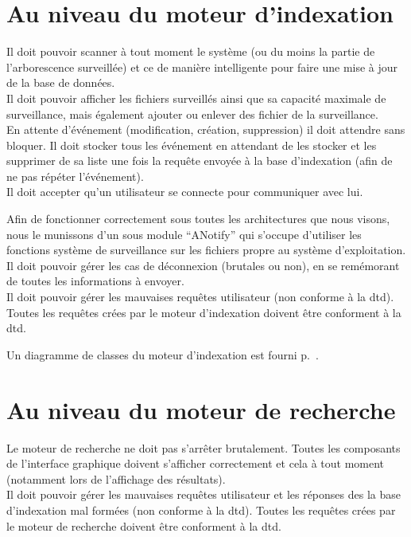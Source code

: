 \documentclass[a4paper,12pt]{report}
\begin{document}
\section{Au niveau du moteur d'indexation}
Il doit pouvoir scanner à tout moment le système (ou du moins la partie de l'\gls{arborescence} surveillée) et ce de manière intelligente pour faire une mise à jour de la base de données.\\
Il doit pouvoir afficher les \glspl{fichier} surveillés ainsi que sa capacité maximale de surveillance, mais également ajouter ou enlever des \gls{fichier} de la surveillance.\\
En attente d'événement (modification, création, suppression) il doit attendre sans bloquer. Il doit stocker tous les événement en attendant de les stocker et les supprimer de sa liste une fois la requête envoyée à la base d'indexation (afin de ne pas répéter l'événement).\\
Il doit accepter qu'un utilisateur se connecte pour communiquer avec lui.

Afin de fonctionner correctement sous toutes les architectures que nous visons, nous le munissons d'un sous module \enquote{ANotify} qui s'occupe d'utiliser les fonctions système de surveillance sur les \glspl{fichier} propre au système d'exploitation.\\
Il doit pouvoir gérer les cas de déconnexion (brutales ou non), en se remémorant de toutes les informations à envoyer.\\
Il doit pouvoir gérer les mauvaises requêtes utilisateur (non conforme à la \gls{dtd}). Toutes les requêtes crées par le moteur d'indexation doivent être conforment à la \gls{dtd}.

Un diagramme de classes du moteur d'indexation est fourni p.~\pageref{diagramme_classes_mi}.

\section{Au niveau du moteur de recherche}
Le moteur de recherche ne doit pas s'arrêter brutalement. Toutes les composants de l'interface graphique doivent s'afficher correctement et cela à tout moment (notamment lors de l'affichage des résultats).\\
Il doit pouvoir gérer les mauvaises requêtes utilisateur et les réponses des la base d'indexation mal formées (non conforme à la \gls{dtd}). Toutes les requêtes crées par le moteur de recherche doivent être conforment à la \gls{dtd}.
\end{document}
